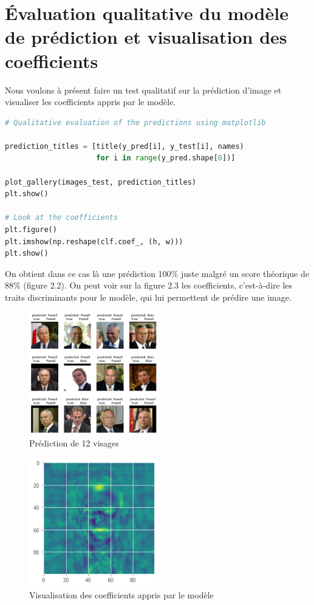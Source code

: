 \documentclass{book}
\begin{document}
\section{Évaluation qualitative du modèle de prédiction et visualisation des coefficients}

Nous voulons à présent faire un test qualitatif sur la prédiction d'image et visualiser les coefficients appris par le modèle.

\begin{lstlisting}[language=Python, caption=Test de prédiction et visualisation des coefficients]
# Qualitative evaluation of the predictions using matplotlib

prediction_titles = [title(y_pred[i], y_test[i], names)
                     for i in range(y_pred.shape[0])]

plot_gallery(images_test, prediction_titles)
plt.show()

# Look at the coefficients
plt.figure()
plt.imshow(np.reshape(clf.coef_, (h, w)))
plt.show()
\end{lstlisting}

On obtient dans ce cas là une prédiction 100\% juste malgré un score théorique de 88\% (figure 2.2). On peut voir sur la figure 2.3 les coefficients, c'est-à-dire les traits discriminants pour le modèle, qui lui permettent de prédire une image.

\begin{figure}[H] %
    \centering
    \includegraphics[width=0.5\textwidth]{figure 4.png}
    \caption{Prédiction de 12 visages}
    \label{fig:exemple4}
\end{figure}

\begin{figure}[H] %
    \centering
    \includegraphics[width=0.5\textwidth]{figure 5.png}
    \caption{Visualisation des coefficients appris par le modèle}
    \label{fig:exemple5}
\end{figure}
\end{document}
